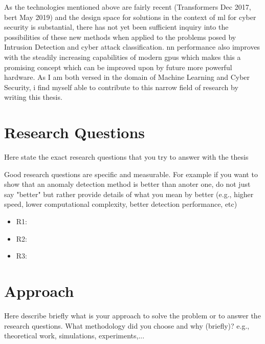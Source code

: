 \begin{itemize}
	As the technologies mentioned above are fairly recent (Transformers Dec 2017, \gls{bert} May 2019) and the design space for solutions in the context of \gls{ml} for cyber security is substantial, there has not yet been sufficient inquiry into the possibilities of these new methods when applied to the problems posed by Intrusion Detection and cyber attack classification. \gls{nn} performance also improves with the steadily increasing capabilities of modern \glspl{gpu} which makes this a promising concept which can be improved upon by future more powerful hardware. As I am both versed in the domain of Machine Learning and Cyber Security, i find myself able to contribute to this narrow field of research by writing this thesis.
	
	
\end{itemize}




\section{Research Questions} \label{sect.research_questions}

Here state the exact research questions that you try to answer with the thesis

Good research questions are specific and measurable. For example if you want to show that an anomaly detection method is better than anoter one, do not just say "better" but rather provide details of what you mean by better (e.g., higher speed, lower computational complexity, better detection performance, etc)

\begin{itemize}
	\item R1: 
	\item R2:
	\item R3:
\end{itemize}



\section{Approach} \label{sect.approach}

Here describe briefly what is your approach to solve the problem or to answer the research questions. What methodology did you choose and why (briefly)? e.g., theoretical work, simulations, experiments,...

